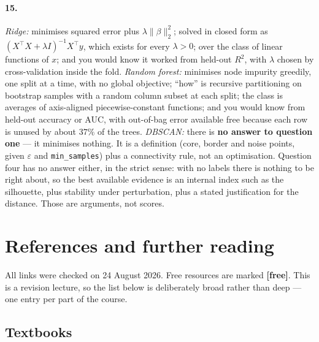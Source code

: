 \documentclass[11pt]{article}
\begin{document}
\paragraph{15.} \emph{Ridge:} minimises squared error plus
$\lambda\lVert\beta\rVert_2^2$; solved in closed form as
$(X^\top X + \lambda I)^{-1}X^\top y$, which exists for every $\lambda > 0$;
over the class of linear functions of $x$; and you would know it worked from
held-out $R^2$, with $\lambda$ chosen by cross-validation inside the fold.
\emph{Random forest:} minimises node impurity greedily, one split at a time,
with no global objective; ``how'' is recursive partitioning on bootstrap
samples with a random column subset at each split; the class is averages of
axis-aligned piecewise-constant functions; and you would know from held-out
accuracy or AUC, with out-of-bag error available free because each row is
unused by about $37\%$ of the trees.
\emph{DBSCAN:} there is \textbf{no answer to question one} --- it minimises
nothing. It is a definition (core, border and noise points, given
$\varepsilon$ and \texttt{min\_samples}) plus a connectivity rule, not an
optimisation. Question four has no answer either, in the strict sense: with
no labels there is nothing to be right about, so the best available evidence
is an internal index such as the silhouette, plus stability under
perturbation, plus a stated justification for the distance. Those are
arguments, not scores.

\section{References and further reading}
\label{sec:refs}

All links were checked on 24 August 2026. Free resources are marked
\textbf{[free]}. This is a revision lecture, so the list below is
deliberately broad rather than deep --- one entry per part of the course.

\subsection*{Textbooks}
\end{document}
